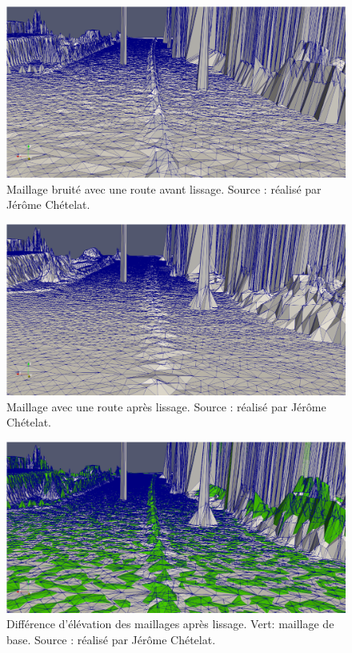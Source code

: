 \begin{figure}[htbp!]
    \centering
    \includegraphics[width=0.8\linewidth]{figures/mesh_noise.png}
    \caption{Maillage bruité avec une route avant lissage. Source : réalisé par Jérôme Chételat.}
    \label{fig:mesh_noise}
\end{figure}

\begin{figure}[htbp!]
    \centering
    \includegraphics[width=0.8\linewidth]{figures/mesh_noise_not_noise.png}
    \caption{Maillage avec une route après lissage. Source : réalisé par Jérôme Chételat.}
    \label{fig:mesh_noise_not_noise}
\end{figure}

\begin{figure}[htbp!]
    \centering
    \includegraphics[width=0.8\linewidth]{figures/mesh_noise_difference.png}
    \caption{Différence d'élévation des maillages après lissage. Vert: maillage de base. Source : réalisé par Jérôme Chételat.}
    \label{fig:mesh_noise_diff}
\end{figure}

